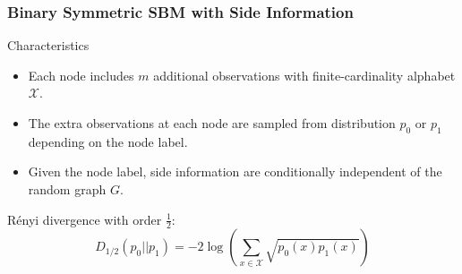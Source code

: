 \documentclass[notheorems]{beamer}
\begin{document}
\begin{frame}
\frametitle{Binary Symmetric SBM with Side Information}
\begin{block}{Characteristics}
\begin{itemize}
	\item   Each node includes $m$ additional observations with
	finite-cardinality alphabet $\mathcal{X}$.
	\item The extra observations at each node are sampled from distribution $p_0$
	or $p_1$ depending on the node label.
	\item Given the node label, side information are conditionally independent of the random
	graph $G$.
\end{itemize}
\end{block}
Rényi divergence with order $\frac{1}{2}$:
\begin{equation*}
	D_{1/2}(p_0 || p_1) = -2\log(\sum_{x \in \mathcal{X}} \sqrt{p_0(x)p_1(x)} )
\end{equation*}
\end{frame}
\end{document}
